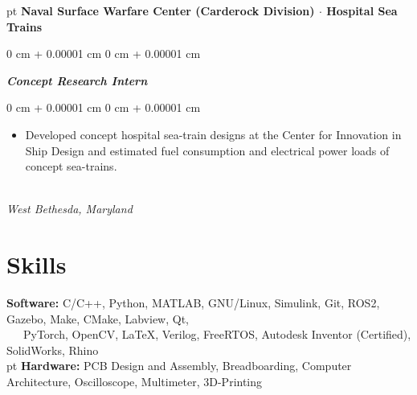\documentclass[9pt, letterpaper]{extarticle}
\newenvironment{highlights}{
    \begin{itemize}[
        topsep=0 pt,
        parsep=0 pt, 
        partopsep=0pt,
        itemsep=0pt,
        leftmargin=0.25 cm + 10pt
    ]
}{
    \end{itemize}
} %
\newenvironment{onecolentry}{
    \begin{adjustwidth}{
        0 cm + 0.00001 cm
    }{
        0 cm + 0.00001 cm
    }
}{
    \end{adjustwidth}
} %
\newenvironment{twocolentry}[2][]{
    \onecolentry
    \def\secondColumn{#2}
    \setcolumnwidth{\fill, 4.5 cm}
    \begin{paracol}{2}
}{
    \switchcolumn \raggedleft \secondColumn
    \end{paracol}
    \endonecolentry
} %
\begin{document}
     pt%
        \textbf{Naval Surface Warfare Center (Carderock Division) \boldmath$\cdot$ Hospital Sea Trains}\\
    \begin{twocolentry}{{Jun 2022 -- Aug 2022}\\\textit{West Bethesda, Maryland}}
        \textbf{\textit{Concept Research Intern}}\\
        \begin{onecolentry}
            \begin{highlights}
            \item Developed concept hospital sea-train designs at the Center for Innovation in Ship Design and estimated fuel consumption and electrical power loads of concept sea-trains.
            \end{highlights}
        \end{onecolentry}
    \end{twocolentry}
    \section{Skills}
    \textbf{Software: }C/C++, Python, MATLAB, GNU/Linux, Simulink, Git, ROS2, Gazebo, Make, CMake, Labview, Qt,\\
    \quad\quad\quad\quad\ \ \ PyTorch, OpenCV, LaTeX, Verilog, FreeRTOS, Autodesk Inventor (Certified), SolidWorks, Rhino\\
     pt%
    \textbf{Hardware: }PCB Design and Assembly, Breadboarding, Computer Architecture, Oscilloscope, Multimeter, 3D-Printing\\ 
\end{document}
